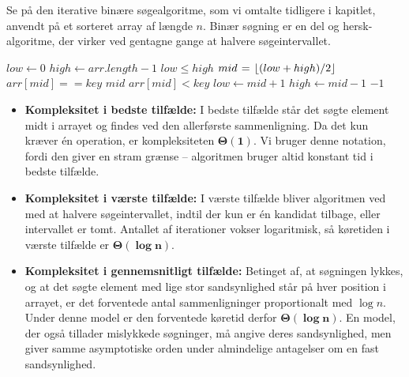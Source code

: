 \begin{example}


Se på den iterative binære søgealgoritme, som vi omtalte tidligere i kapitlet, anvendt på et sorteret array af længde $n$. Binær søgning er en del og hersk-algoritme, der virker ved gentagne gange at halvere søgeintervallet.

\begin{codebox}
    \li $low \gets 0$ 
    \li $high \gets arr.length -1$ 
    \li \While $low \leq high$ \Do
    \li     $mid \mathrel{\hspace{1pt}=\hspace{1pt}} \left\lfloor (low + high) / 2 \right\rfloor$ 
    \li     \If $arr[mid] == key$ \Then
    \li         \Return $mid$ 
    \li     \ElseIf $arr[mid] < key$ \Then
    \li         $low \gets mid + 1$ 
    \li     \Else
    \li         $high \gets mid - 1$ 
        \End
        \End
    \li \Return $-1$ 
\end{codebox}

\begin{itemize}
    \item \textbf{Kompleksitet i bedste tilfælde: } 
    I bedste tilfælde står det søgte element midt i arrayet og findes ved den allerførste sammenligning. Da det kun kræver én operation, er kompleksiteten $\boldsymbol{\Theta(1)}$. Vi bruger denne notation, fordi den giver en stram grænse -- algoritmen bruger altid konstant tid i bedste tilfælde.

    \item \textbf{Kompleksitet i værste tilfælde: }
    I værste tilfælde bliver algoritmen ved med at halvere søgeintervallet, indtil der kun er én kandidat tilbage, eller intervallet er tomt. Antallet af iterationer vokser logaritmisk, så køretiden i værste tilfælde er $\boldsymbol{\Theta(\log n)}$.

    \item \textbf{Kompleksitet i gennemsnitligt tilfælde: }  
    Betinget af, at søgningen lykkes, og at det søgte element med lige stor sandsynlighed står på hver position i arrayet, er det forventede antal sammenligninger proportionalt med $\log n$. Under denne model er den forventede køretid derfor $\boldsymbol{\Theta(\log n)}$. En model, der også tillader mislykkede søgninger, må angive deres sandsynlighed, men giver samme asymptotiske orden under almindelige antagelser om en fast sandsynlighed.
\end{itemize}
\end{example}

